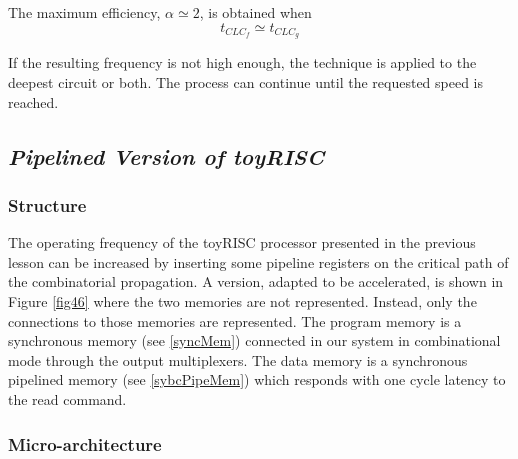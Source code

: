 The maximum efficiency, $\alpha \simeq 2$, is obtained when
$$t_{CLC_{f}} \simeq t_{CLC_{g}}$$

If the resulting frequency is not high enough, the technique is applied to the deepest circuit or both. The process can continue until the requested speed is reached.

\subsection{{\bf {\em Pipelined Version of toyRISC}}}

\subsubsection{Structure}

The operating frequency of the toyRISC processor presented in the previous lesson can be increased by inserting some pipeline registers on the critical path of the combinatorial propagation. A version, adapted to be accelerated, is shown in Figure \ref{fig46} where the two memories are not represented.
Instead, only the connections to those memories are represented. The program memory is a synchronous memory (see \ref{syncMem}) connected in our system in combinational mode through the output multiplexers. The data memory is a synchronous pipelined memory (see \ref{sybcPipeMem}) which responds with one cycle latency to the read command.


\subsubsection{Micro-architecture}

